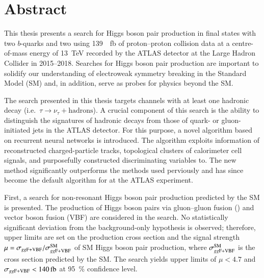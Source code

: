 \chapter*{Abstract}


This thesis presents a search for Higgs boson pair production in final states
with two $b$-quarks and two \tauleptons using \SI{139}{\per\femto\barn} of
proton--proton collision data at a centre-of-mass energy of \SI{13}{\TeV}
recorded by the ATLAS detector at the Large Hadron Collider in 2015--2018.
Searches for Higgs boson pair production are important to solidify our
understanding of electroweak symmetry breaking in the Standard Model (SM) and,
in addition, serve as probes for physics beyond the SM.

The search presented in this thesis targets channels with at least one hadronic
\taulepton decay (i.e.~$\tau \to \nu_{\tau} + \text{hadrons}$). A crucial
component of this search is the ability to distinguish the signatures of
hadronic \taulepton decays from those of quark- or gluon-initiated jets in the
ATLAS detector. For this purpose, a novel \tauid algorithm based on recurrent
neural networks is introduced. The algorithm exploits information of
reconstructed charged-particle tracks, topological clusters of calorimeter cell
signals, and purposefully constructed discriminating variables
to. The new \tauid method significantly outperforms the methods used
perviously and has since become the default algorithm for \tauid at the ATLAS
experiment.

First, a search for non-resonant Higgs boson pair production predicted by the SM
is presented. The production of Higgs boson pairs via gluon--gluon fusion (\ggF)
and vector boson fusion (VBF) are considered in the search. No statistically
significant deviation from the background-only hypothesis is observed;
therefore, upper limits are set on the production cross section \xsecggfvbf and
the signal strength~$\mu = \sigma_{gg\text{F+VBF}} / \sigma_{gg\text{F+VBF}}^{\text{SM}}$ of SM Higgs
boson pair production, where $\sigma_{gg\text{F+VBF}}^{\text{SM}}$ is the cross section
predicted by the SM. The search yields upper limits of $\mu < \num{4.7}$ and
$\xsecggfvbf < \SI{140}{\femto\barn}$ at \SI{95}{\percent} confidence level.


